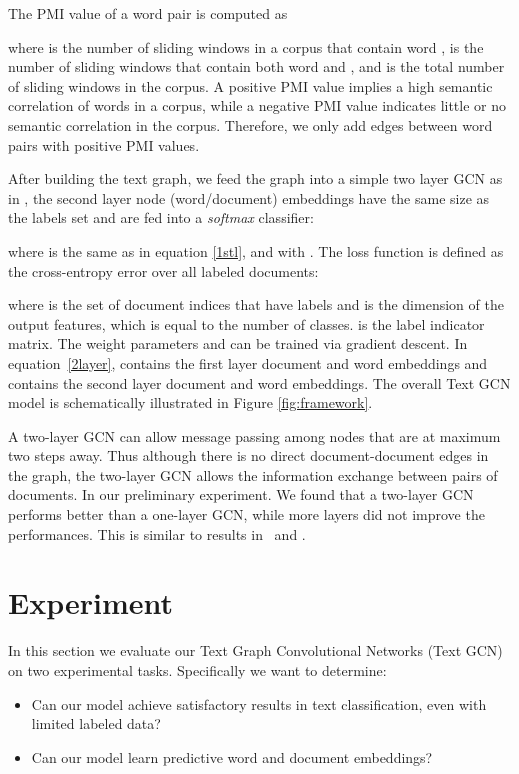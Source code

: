 \documentclass[letterpaper]{article} \usepackage{aaai19}  \usepackage{times}  \usepackage{helvet}  \usepackage{courier}  \usepackage{url}  \usepackage{graphicx}  \frenchspacing  \usepackage{amsmath}
\begin{document}
The PMI value of a word pair  is computed as



where  is the number of sliding windows in a corpus that contain word ,  is the number of sliding windows that contain both word  and , and  is the total number of sliding windows in the corpus. A positive PMI value implies a high semantic correlation of words in a corpus, while a negative PMI value indicates little or no semantic correlation in the corpus. Therefore, we only add edges between word pairs with positive PMI values.

After building the text graph, we feed the graph into a simple two layer GCN as in \cite{kipf2017semi}, the second layer node (word/document) embeddings have the same size as the labels set and are fed into a \textit{softmax} classifier:

where  is the same as in equation \ref{1stl}, and  with . The loss function is defined as the cross-entropy error over all labeled documents:

where  is the set of document indices that have labels and  is the dimension of the output features, which is equal to the number of classes.  is the label indicator matrix. The weight parameters  and  can be trained via gradient descent. In equation~\ref{2layer},  contains the first layer document and word embeddings and  contains the second layer document and word embeddings. The overall Text GCN model is schematically illustrated in Figure \ref{fig:framework}.


A two-layer GCN can allow message passing among nodes that are at maximum two steps away. Thus although there is no direct document-document edges in the graph, the two-layer GCN allows the information exchange between pairs of documents.
In our preliminary experiment. We found that a two-layer GCN performs better than a one-layer GCN, while more layers did not improve the performances. This is similar to results in~\cite{kipf2017semi} and \cite{DBLP:conf/aaai/LiHW18}.















\section{Experiment}
In this section we evaluate our Text Graph Convolutional Networks (Text GCN) on two experimental tasks. Specifically we want to determine:
\begin{itemize}
  \item Can our model achieve satisfactory results in text classification, even with limited labeled data?
  \item Can our model learn predictive word and document embeddings?
  \end{itemize}
\end{document}
